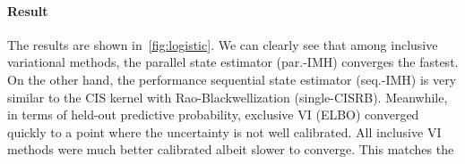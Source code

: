   \vspace{-0.05in}
\paragraph{Result}
The results are shown in~\cref{fig:logistic}.
We can clearly see that among inclusive variational methods, the parallel state estimator (par.-IMH) converges the fastest.
On the other hand, the performance sequential state estimator (seq.-IMH) is very similar to the CIS kernel with Rao-Blackwellization (single-CISRB).
Meanwhile, in terms of held-out predictive probability, exclusive VI (ELBO) converged quickly to a point where the uncertainty is not well calibrated.
All inclusive VI methods were much better calibrated albeit slower to converge.
This matches the 

  \vspace{-0.05in}
